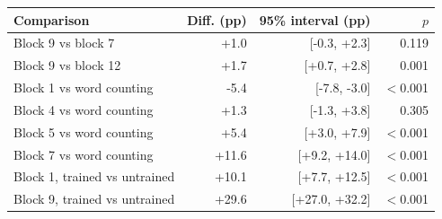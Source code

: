 \begin{tabular}{lrrr}
\toprule
Comparison & Diff. (pp) & 95\% interval (pp) & $p$ \\
\midrule
Block 9 vs block 7 & +1.0 & [-0.3, +2.3] & 0.119 \\
Block 9 vs block 12 & +1.7 & [+0.7, +2.8] & 0.001 \\
Block 1 vs word counting & -5.4 & [-7.8, -3.0] & $<$0.001 \\
Block 4 vs word counting & +1.3 & [-1.3, +3.8] & 0.305 \\
Block 5 vs word counting & +5.4 & [+3.0, +7.9] & $<$0.001 \\
Block 7 vs word counting & +11.6 & [+9.2, +14.0] & $<$0.001 \\
Block 1, trained vs untrained & +10.1 & [+7.7, +12.5] & $<$0.001 \\
Block 9, trained vs untrained & +29.6 & [+27.0, +32.2] & $<$0.001 \\
\bottomrule
\end{tabular}
